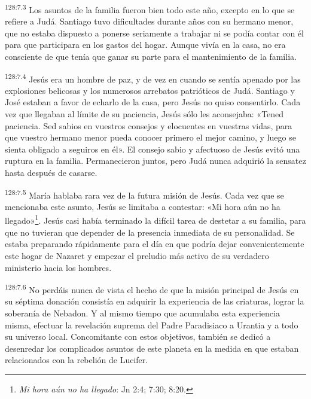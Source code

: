 \par
\textsuperscript{128:7.3} Los asuntos de la familia fueron bien todo este año, excepto en lo que se refiere a Judá. Santiago tuvo dificultades durante años con su hermano menor, que no estaba dispuesto a ponerse seriamente a trabajar ni se podía contar con él para que participara en los gastos del hogar. Aunque vivía en la casa, no era consciente de que tenía que ganar su parte para el mantenimiento de la familia.

\par
\textsuperscript{128:7.4} Jesús era un hombre de paz, y de vez en cuando se sentía apenado por las explosiones belicosas y los numerosos arrebatos patrióticos de Judá. Santiago y José estaban a favor de echarlo de la casa, pero Jesús no quiso consentirlo. Cada vez que llegaban al límite de su paciencia, Jesús sólo les aconsejaba: «Tened paciencia. Sed sabios en vuestros consejos y elocuentes en vuestras vidas, para que vuestro hermano menor pueda conocer primero el mejor camino, y luego se sienta obligado a seguiros en él». El consejo sabio y afectuoso de Jesús evitó una ruptura en la familia. Permanecieron juntos, pero Judá nunca adquirió la sensatez hasta después de casarse.

\par
\textsuperscript{128:7.5} María hablaba rara vez de la futura misión de Jesús. Cada vez que se mencionaba este asunto, Jesús se limitaba a contestar: «Mi hora aún no ha llegado»\footnote{\textit{Mi hora aún no ha llegado}: Jn 2:4; 7:30; 8:20.}. Jesús casi había terminado la difícil tarea de destetar a su familia, para que no tuvieran que depender de la presencia inmediata de su personalidad. Se estaba preparando rápidamente para el día en que podría dejar convenientemente este hogar de Nazaret y empezar el preludio más activo de su verdadero ministerio hacia los hombres.

\par
\textsuperscript{128:7.6} No perdáis nunca de vista el hecho de que la misión principal de Jesús en su séptima donación consistía en adquirir la experiencia de las criaturas, lograr la soberanía de Nebadon. Y al mismo tiempo que acumulaba esta experiencia misma, efectuar la revelación suprema del Padre Paradisiaco a Urantia y a todo su universo local. Concomitante con estos objetivos, también se dedicó a desenredar los complicados asuntos de este planeta en la medida en que estaban relacionados con la rebelión de Lucifer.

